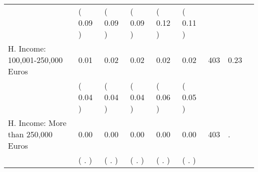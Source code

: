 \begin{tabular}{L{6.2cm} C{1.8cm} C{1.8cm} C{1.8cm} C{1.8cm} C{1.8cm} C{1.8cm} C{0.3cm} C{0.3cm}}
 & (     0.09 ) & (     0.09 ) & (     0.09 ) & (     0.12 ) & (     0.11 )  & \\
H. Income: 100,001-250,000 Euros &      0.01 &      0.02 &      0.02 &      0.02 &      0.02  & 403 &       0.23 \\ 
 & (     0.04 ) & (     0.04 ) & (     0.04 ) & (     0.06 ) & (     0.05 )  & \\
H. Income: More than 250,000 Euros &      0.00 &      0.00 &      0.00 &      0.00 &      0.00  & 403 &          . \\ 
 & (        . ) & (        . ) & (        . ) & (        . ) & (        . )  & \\
\bottomrule
\end{tabular}
